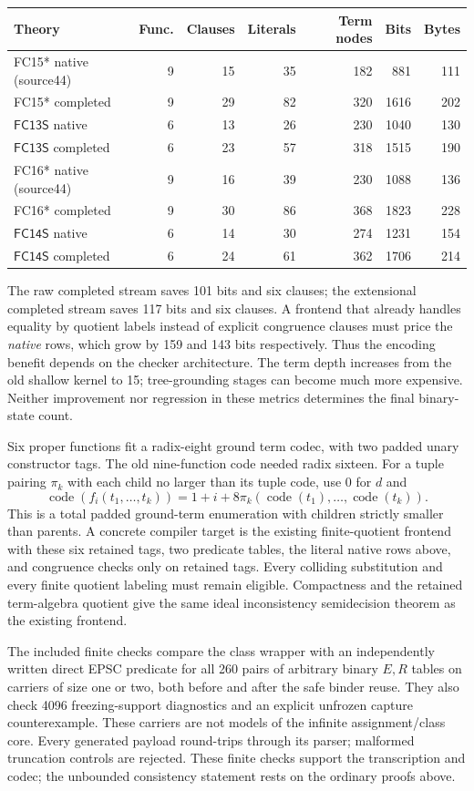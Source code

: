 \documentclass[11pt]{article}
\newcommand{\FC}{\ensuremath{\mathsf{FC13S}}}
\newcommand{\FCE}{\ensuremath{\mathsf{FC14S}}}
\begin{document}
\begin{center}
\begin{tabular}{lrrrrrr}
\toprule
Theory & Func. & Clauses & Literals & Term nodes & Bits & Bytes\\
\midrule
FC15* native (source44) &9&15&35&182&881&111\\
FC15* completed &9&29&82&320&1616&202\\
$\FC$ native &6&13&26&230&1040&130\\
$\FC$ completed &6&23&57&318&1515&190\\
FC16* native (source44) &9&16&39&230&1088&136\\
FC16* completed &9&30&86&368&1823&228\\
$\FCE$ native &6&14&30&274&1231&154\\
$\FCE$ completed &6&24&61&362&1706&214\\
\bottomrule
\end{tabular}
\end{center}

The raw completed stream saves 101 bits and six clauses; the extensional
completed stream saves 117 bits and six clauses.  A frontend that already
handles equality by quotient labels instead of explicit congruence clauses
must price the \emph{native} rows, which grow by 159 and 143 bits respectively.
Thus the encoding benefit depends on the checker architecture.  The term
depth increases from the old shallow kernel to 15; tree-grounding stages can
become much more expensive.  Neither improvement nor regression in these
metrics determines the final binary-state count.

Six proper functions fit a radix-eight ground term codec, with two padded
unary constructor tags.  The old nine-function code needed radix sixteen.
For a tuple pairing $\pi_k$ with each child no larger than its tuple code,
use $0$ for $d$ and
\[
 \operatorname{code}(f_i(t_1,\ldots,t_k))
 =1+i+8\pi_k(\operatorname{code}(t_1),\ldots,\operatorname{code}(t_k)).
\]
This is a total padded ground-term enumeration with children strictly
smaller than parents.  A concrete compiler target is the existing
finite-quotient frontend with these six retained tags, two predicate tables,
the literal native rows above, and congruence checks only on retained tags.
Every colliding substitution and every finite quotient labeling must remain
eligible.  Compactness and the retained term-algebra quotient give the same
ideal inconsistency semidecision theorem as the existing frontend.

The included finite checks compare the class wrapper with an independently
written direct EPSC predicate for all 260 pairs of arbitrary binary $E,R$
tables on carriers of size one or two, both before and after the safe binder
reuse.  They also check 4096 freezing-support diagnostics and an explicit
unfrozen capture counterexample.  These carriers are not models of the
infinite assignment/class core.  Every generated payload round-trips through
its parser; malformed truncation controls are rejected.  These finite checks
support the transcription and codec; the unbounded consistency statement
rests on the ordinary proofs above.
\end{document}
